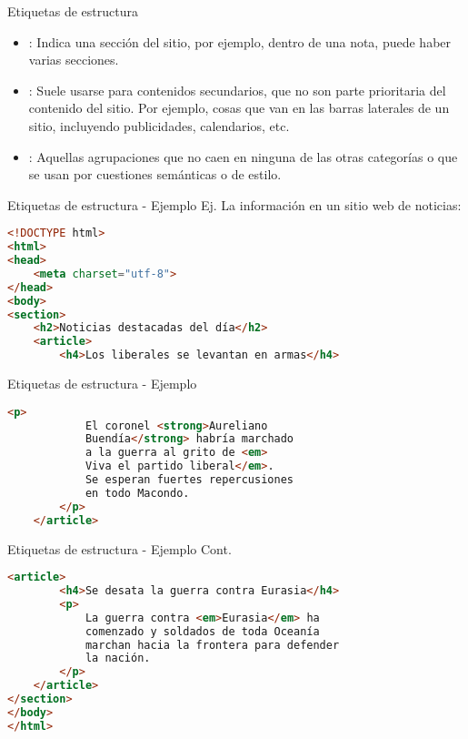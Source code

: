 \begin{frame}[fragile]{Etiquetas de estructura}
	\begin{itemize}
		\item {}: Indica una sección del sitio, por ejemplo, dentro de una
			nota, puede haber varias secciones.
		\item {}:
			Suele usarse para contenidos secundarios, que no son parte prioritaria del
			contenido del sitio. Por ejemplo, cosas que van en las barras laterales de
			un sitio, incluyendo publicidades, calendarios, etc.
		\item {}: Aquellas agrupaciones que no caen en ninguna de las
			otras categorías o que se usan por cuestiones semánticas o de estilo.
\end{itemize}
\end{frame}


\begin{frame}[fragile]{Etiquetas de estructura - Ejemplo}
	Ej. La información en un sitio web de noticias:
	\begin{lstlisting}[language=HTML]
<!DOCTYPE html>
<html>
<head>
	<meta charset="utf-8">
</head>
<body>
<section>
	<h2>Noticias destacadas del día</h2>
	<article>
		<h4>Los liberales se levantan en armas</h4>
	\end{lstlisting}
\end{frame}



\begin{frame}[fragile]{Etiquetas de estructura - Ejemplo}
	\begin{lstlisting}[language=HTML]
		<p>
			El coronel <strong>Aureliano
			Buendía</strong> habría marchado
			a la guerra al grito de <em>
			Viva el partido liberal</em>.
			Se esperan fuertes repercusiones
			en todo Macondo.
		</p>
	</article>
	\end{lstlisting}
\end{frame}


\begin{frame}[fragile]{Etiquetas de estructura - Ejemplo Cont.}
	\begin{lstlisting}[language=HTML]
	<article>
		<h4>Se desata la guerra contra Eurasia</h4>
		<p>
			La guerra contra <em>Eurasia</em> ha
			comenzado y soldados de toda Oceanía
			marchan hacia la frontera para defender
			la nación.
		</p>
	</article>
</section>
</body>
</html>
	\end{lstlisting}
\end{frame}

